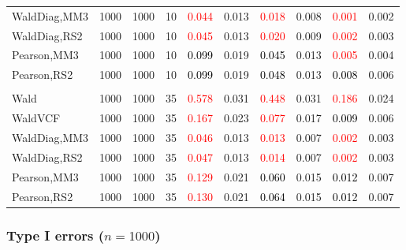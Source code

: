 \documentclass[
]{article}
\begin{document}
\begin{table}[H]
{\begin{tabular}[t]{lrrrrrrlrr}
\hspace{1em}WaldDiag,MM3 & 1000 & 1000 & 10 & \textcolor{red}{0.044} & 0.013 & \textcolor{red}{0.018} & 0.008 & \textcolor{red}{0.001} & 0.002\\
\hspace{1em}WaldDiag,RS2 & 1000 & 1000 & 10 & \textcolor{red}{0.045} & 0.013 & \textcolor{red}{0.020} & 0.009 & \textcolor{red}{0.002} & 0.003\\
\hspace{1em}Pearson,MM3 & 1000 & 1000 & 10 & \textcolor{black}{0.099} & 0.019 & \textcolor{black}{0.045} & 0.013 & \textcolor{red}{0.005} & 0.004\\
\hspace{1em}Pearson,RS2 & 1000 & 1000 & 10 & \textcolor{black}{0.099} & 0.019 & \textcolor{black}{0.048} & 0.013 & \textcolor{black}{0.008} & 0.006\\
\addlinespace[0.3em]
\multicolumn{10}{l}{\textbf{3F 15V}}\\
\hspace{1em}Wald & 1000 & 1000 & 35 & \textcolor{red}{0.578} & 0.031 & \textcolor{red}{0.448} & 0.031 & \textcolor{red}{0.186} & 0.024\\
\hspace{1em}WaldVCF & 1000 & 1000 & 35 & \textcolor{red}{0.167} & 0.023 & \textcolor{red}{0.077} & 0.017 & \textcolor{black}{0.009} & 0.006\\
\hspace{1em}WaldDiag,MM3 & 1000 & 1000 & 35 & \textcolor{red}{0.046} & 0.013 & \textcolor{red}{0.013} & 0.007 & \textcolor{red}{0.002} & 0.003\\
\hspace{1em}WaldDiag,RS2 & 1000 & 1000 & 35 & \textcolor{red}{0.047} & 0.013 & \textcolor{red}{0.014} & 0.007 & \textcolor{red}{0.002} & 0.003\\
\hspace{1em}Pearson,MM3 & 1000 & 1000 & 35 & \textcolor{red}{0.129} & 0.021 & \textcolor{black}{0.060} & 0.015 & \textcolor{black}{0.012} & 0.007\\
\hspace{1em}Pearson,RS2 & 1000 & 1000 & 35 & \textcolor{red}{0.130} & 0.021 & \textcolor{black}{0.064} & 0.015 & \textcolor{black}{0.012} & 0.007\\
\bottomrule
\end{tabular}}
\endgroup{}
\end{table}

\hypertarget{type-i-errors-n1000-3}{%
\subsubsection{\texorpdfstring{Type I errors
(\(n=1000\))}{Type I errors (n=1000)}}\label{type-i-errors-n1000-3}}
\end{document}
